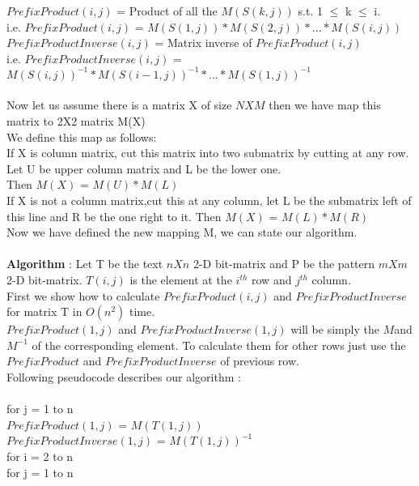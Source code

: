 \documentclass{article}
\begin{document}
$PrefixProduct(i,j)$ = Product of all the $M(S(k,j))$ s.t. 1 $\leq$ k $\leq$ i. \\
i.e. $PrefixProduct(i,j)$ = $M(S(1,j)) * M(S(2,j)) * ... * M(S(i,j))$\\
$PrefixProductInverse(i,j)$ = Matrix inverse of $PrefixProduct(i,j)$ \\
i.e. $PrefixProductInverse(i,j)$ = $M(S(i,j))^{-1} * M(S(i-1,j))^{-1} * ... * M(S(1,j))^{-1}$ \\\\
Now let us assume there is a matrix X of size $NXM$ then we have map this matrix to 2X2 matrix M(X) \\
We define this map as follows: \\ 
If X is column matrix, cut this matrix into two submatrix by cutting at any row. Let U be upper column matrix and L be the lower one. \\
Then $M(X)$ = $M(U) * M(L)$ \\ 
If X is not a column matrix,cut this at any column, let L be the submatrix left of this line and R be the one right to it.
Then $M(X)$ = $M(L) * M(R)$ \\
Now we have defined the new mapping M, we can state our algorithm. \\\\
\textbf{Algorithm} : 
Let T be the text $nXn$ 2-D bit-matrix and P be the pattern $mXm$ 2-D bit-matrix.
$T(i,j)$ is the element at the $i^{th}$ row and $j^{th}$ column.\\  
First we show how to calculate $PrefixProduct(i,j)$ and $PrefixProductInverse$ for matrix T in $O(n^{2})$ time. \\
$PrefixProduct(1,j)$ and $PrefixProductInverse(1,j)$ will be simply the $M $and $M^{-1}$ of the corresponding element.
To calculate them for other rows just use the $PrefixProduct$ and $PrefixProductInverse$ of previous row. \\
Following pseudocode describes our algorithm : \\\\
for j = 1 to n  \\
\hspace*{1cm}	$PrefixProduct(1,j)$ = $M(T(1,j))$ \\ 
\hspace*{1cm}	$PrefixProductInverse(1,j)$ = $M(T(1,j))^{-1}$ \\
for i = 2 to n  \\ 
\hspace*{1cm} for j = 1 to n \\ 
\end{document}
